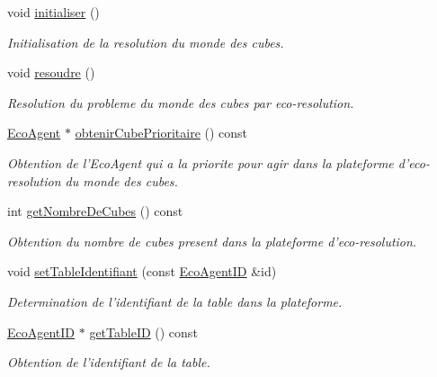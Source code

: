 \begin{CompactItemize}
\item 
void \hyperlink{classPlateformeMondeDesCubes_67160be6f5ecd0b8f3fffeb1a7bd81ba}{initialiser} ()
\begin{CompactList}\small\item\em Initialisation de la resolution du monde des cubes. \item\end{CompactList}\item 
void \hyperlink{classPlateformeMondeDesCubes_c7be18c8d02e2743e884545828cfabed}{resoudre} ()
\begin{CompactList}\small\item\em Resolution du probleme du monde des cubes par eco-resolution. \item\end{CompactList}\item 
\hyperlink{classEcoAgent}{EcoAgent} $\ast$ \hyperlink{classPlateformeMondeDesCubes_5f3ebe8acdfdbb447c13de8d3cbac438}{obtenirCubePrioritaire} () const 
\begin{CompactList}\small\item\em Obtention de l'EcoAgent qui a la priorite pour agir dans la plateforme d'eco-resolution du monde des cubes. \item\end{CompactList}\item 
int \hyperlink{classPlateformeMondeDesCubes_a341731830c30c695d5ef80c90377165}{getNombreDeCubes} () const 
\begin{CompactList}\small\item\em Obtention du nombre de cubes present dans la plateforme d'eco-resolution. \item\end{CompactList}\item 
void \hyperlink{classPlateformeMondeDesCubes_cf6eccc70251d89c4d12c921f44934af}{setTableIdentifiant} (const \hyperlink{classEcoAgentID}{EcoAgentID} \&id)
\begin{CompactList}\small\item\em Determination de l'identifiant de la table dans la plateforme. \item\end{CompactList}\item 
\hyperlink{classEcoAgentID}{EcoAgentID} $\ast$ \hyperlink{classPlateformeMondeDesCubes_232d0a6c6cbd1bc2d8622fa92dd64ce1}{getTableID} () const 
\begin{CompactList}\small\item\em Obtention de l'identifiant de la table. \item\end{CompactList}\item 

\end{CompactItemize}
